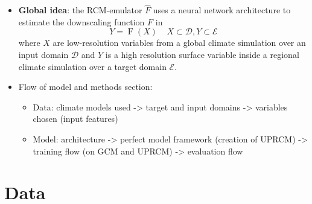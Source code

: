 \documentclass[a4paper,11pt,oneside]{report}
\begin{document}
\begin{itemize}
\item \textbf{Global idea}: the RCM-emulator $\hat{F}$ uses a neural network architecture to estimate the downscaling function $F$ in 
\begin{equation}
    Y = \operatorname{F}(X) \;\;\;\; X\subset\mathcal{D}, Y\subset\mathcal{E}
    \end{equation}
where $X$ are low-resolution variables from a global climate simulation over an input domain $\mathcal{D}$ and $Y$ is a high resolution surface variable inside a regional climate simulation over a target domain $\mathcal{E}$. 
\item Flow of model and methods section: 
\begin{itemize}
    \item Data: climate models used -> target and input domains -> variables chosen (input features)
    \item Model: architecture -> perfect model framework (creation of UPRCM) -> training flow (on GCM and UPRCM) -> evaluation flow
\end{itemize}
\end{itemize}

\section{Data}\label{sec:data}
\end{document}
